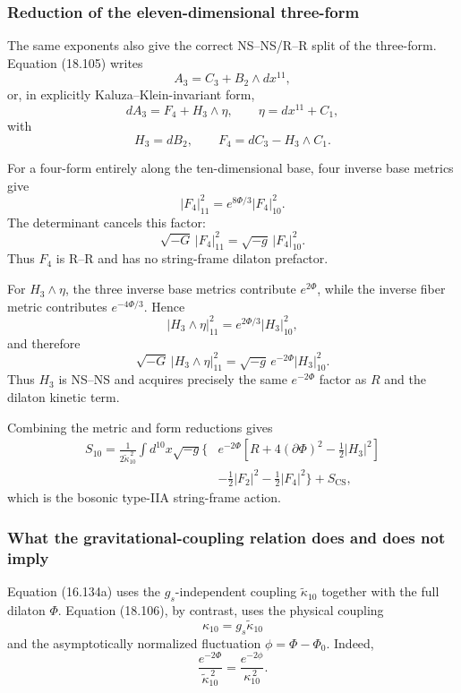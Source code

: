 \documentclass[
  10pt,
  a4paper,
  openany]{book}
\begin{document}
\subsubsection{Reduction of the eleven-dimensional
three-form}\label{reduction-of-the-eleven-dimensional-three-form}

The same exponents also give the correct NS--NS/R--R split of the
three-form. Equation (18.105) writes \[
A_3=C_3+B_2\wedge dx^{11},
\] or, in explicitly Kaluza--Klein-invariant form, \[
dA_3
=F_4+H_3\wedge\eta,
\qquad
\eta=dx^{11}+C_1,
\] with \[
H_3=dB_2,
\qquad
F_4=dC_3-H_3\wedge C_1.
\]

For a four-form entirely along the ten-dimensional base, four inverse
base metrics give \[
|F_4|_{11}^2
=e^{8\Phi/3}|F_4|_{10}^2.
\] The determinant cancels this factor: \[
\sqrt{-G}\,|F_4|_{11}^2
=\sqrt{-g}\,|F_4|_{10}^2.
\] Thus \(F_4\) is R--R and has no string-frame dilaton prefactor.

For \(H_3\wedge\eta\), the three inverse base metrics contribute
\(e^{2\Phi}\), while the inverse fiber metric contributes
\(e^{-4\Phi/3}\). Hence \[
|H_3\wedge\eta|_{11}^2
=e^{2\Phi/3}|H_3|_{10}^2,
\] and therefore \[
\sqrt{-G}\,|H_3\wedge\eta|_{11}^2
=\sqrt{-g}\,e^{-2\Phi}|H_3|_{10}^2.
\] Thus \(H_3\) is NS--NS and acquires precisely the same \(e^{-2\Phi}\)
factor as \(R\) and the dilaton kinetic term.

Combining the metric and form reductions gives \[
\boxed{
\begin{aligned}
S_{10}
=\frac1{2\widetilde\kappa_{10}^{\,2}}
\int d^{10}x\sqrt{-g}
\Bigg\{
&e^{-2\Phi}
\left[
R+4(\partial\Phi)^2-\frac12|H_3|^2
\right]\\
&-\frac12|F_2|^2
-\frac12|F_4|^2
\Bigg\}
+S_{\mathrm{CS}},
\end{aligned}
}
\] which is the bosonic type-IIA string-frame action.

\subsubsection{What the gravitational-coupling relation does and does
not
imply}\label{what-the-gravitational-coupling-relation-does-and-does-not-imply}

Equation (16.134a) uses the \(g_s\)-independent coupling
\(\widetilde\kappa_{10}\) together with the full dilaton \(\Phi\).
Equation (18.106), by contrast, uses the physical coupling \[
\kappa_{10}=g_s\widetilde\kappa_{10}
\] and the asymptotically normalized fluctuation \(\phi=\Phi-\Phi_0\).
Indeed, \[
\frac{e^{-2\Phi}}{\widetilde\kappa_{10}^{\,2}}
=\frac{e^{-2\phi}}{\kappa_{10}^{\,2}}.
\]
\end{document}
